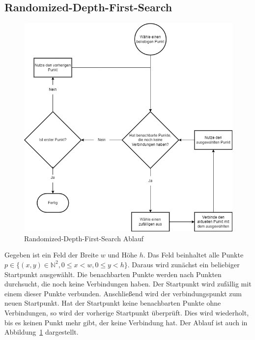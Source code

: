 \documentclass[12pt]{article}
\begin{document}
        \subsection{Randomized-Depth-First-Search}\label{subsec:randomized-depth-first-search}
            \begin{figure}[ht!]
                \centering
                \includegraphics[width=\paperwidth/2]{../assets/img/Randomised-Depth-First-Search}
                \caption{Randomized-Depth-First-Search Ablauf}
                \label{fig:randomized-depth-first-search-flow}
            \end{figure}
            Gegeben ist ein Feld der Breite $w$ und Höhe $h$.
            Das Feld beinhaltet alle Punkte $p\in\{(x,y)\in\mathbb{N}^2, 0\leq x<w, 0\leq y<h\}$.
            Daraus wird zunächst ein beliebiger Startpunkt ausgewählt.
            Die benachbarten Punkte werden nach Punkten durchsucht, die noch keine Verbindungen haben.
            Der Startpunkt wird zufällig mit einem dieser Punkte verbunden.
            Anschließend wird der verbindungspunkt zum neuen Startpunkt.
            Hat der Startpunkt keine benachbarten Punkte ohne Verbindungen, so wird der vorherige Startpunkt überprüft.
            Dies wird wiederholt, bis es keinen Punkt mehr gibt, der keine Verbindung hat.
            Der Ablauf ist auch in Abbildung~\ref{fig:randomized-depth-first-search-flow} dargestellt.
\end{document}
